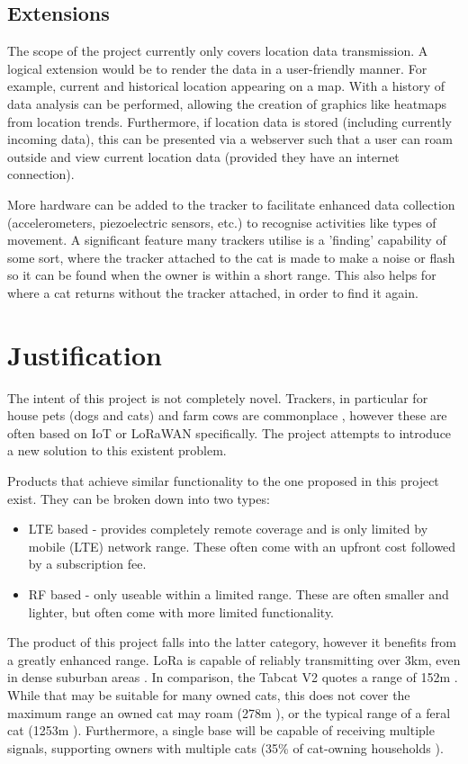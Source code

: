 \documentclass[11pt]{article}
\begin{document}
\subsection{Extensions}
The scope of the project currently only covers location data transmission.
A logical extension would be to render the data in a user-friendly manner.
For example, current and historical location appearing on a map.
With a history of data analysis can be performed, allowing the creation of graphics like heatmaps from location trends. 
Furthermore, if location data is stored (including currently incoming data), 
this can be presented via a webserver such that a user can roam outside and view current location data 
(provided they have an internet connection).

More hardware can be added to the tracker to facilitate enhanced data collection
(accelerometers, piezoelectric sensors, etc.) to recognise activities like types of movement.
A significant feature many trackers utilise is a 'finding' capability of some sort, where the tracker attached to the cat is made to make a noise or flash so it can be found when the owner is within a short range.
This also helps for where a cat returns without the tracker attached, in order to find it again.


\section{Justification}
    The intent of this project is not completely novel. Trackers, in particular for house pets (dogs and cats) and farm cows are commonplace \cite{davcev:lorawan,sivarman:tracker}, 
however these are often based on IoT or LoRaWAN specifically.
The project attempts to introduce a new solution to this existent problem.

Products that achieve similar functionality to the one proposed in this project exist. They can be broken down into two types: 
\begin{itemize}
    \item LTE based - provides completely remote coverage and is only limited by mobile (LTE) network range. These often come with an upfront cost followed by a subscription fee.
    \item RF based - only useable within a limited range. These are often smaller and lighter, but often come with more limited functionality. 
\end{itemize}
The product of this project falls into the latter category, however it benefits from a greatly enhanced range.
LoRa is capable of reliably transmitting over 3km, even in dense suburban areas \cite{augustin:lora}.
In comparison, the Tabcat V2 quotes a range of 152m \cite{tabcat:tracker}. 
While that may be suitable for many owned cats, this does not cover the maximum range an owned cat may roam (278m \cite{hammer:urbanisaton}),
or the typical range of a feral cat (1253m \cite{horn:range}).
Furthermore, a single base will be capable of receiving multiple signals, supporting owners with multiple cats (35\% of cat-owning households \cite{catsprotection:catsreport}).
\end{document}
